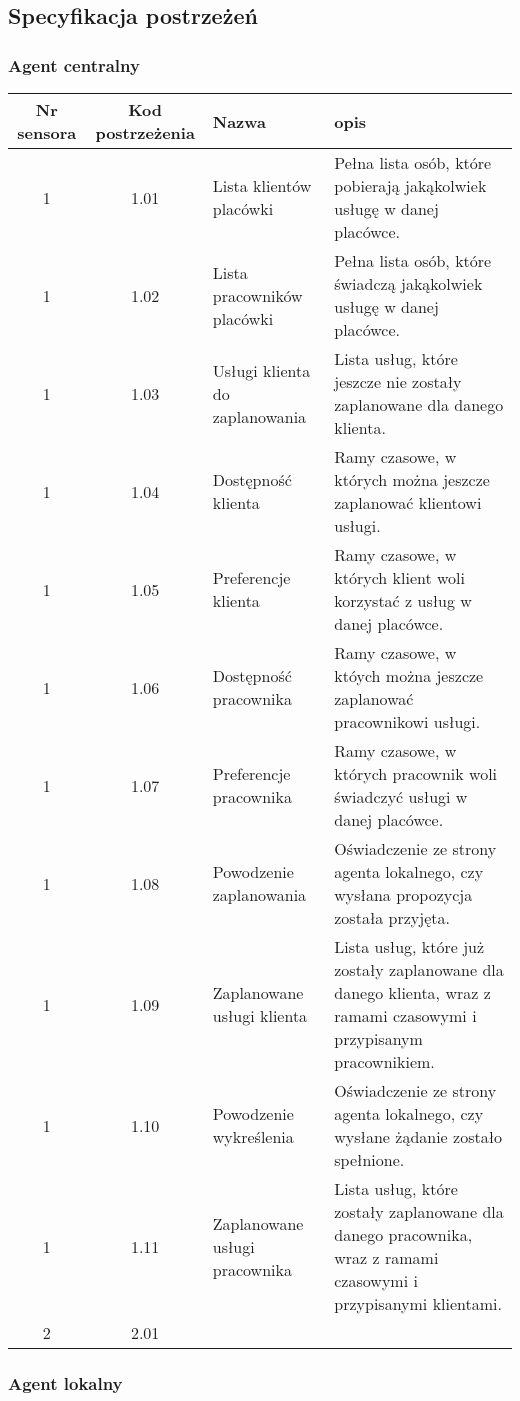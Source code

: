 \subsection{Specyfikacja postrzeżeń}

\subsubsection{Agent centralny}

\begin{tabular}{c|c|p{3cm}|p{5cm}}
Nr sensora & Kod postrzeżenia & Nazwa & opis\\
\hline
1 & 1.01 & Lista klientów placówki & Pełna lista osób, które pobierają jakąkolwiek usługę w danej placówce.\\
1 & 1.02 & Lista pracowników placówki & Pełna lista osób, które świadczą jakąkolwiek usługę w danej placówce.\\
1 & 1.03 & Usługi klienta do zaplanowania & Lista usług, które jeszcze nie zostały zaplanowane dla danego klienta.\\
1 & 1.04 & Dostępność klienta & Ramy czasowe, w których można jeszcze zaplanować klientowi usługi.\\
1 & 1.05 & Preferencje klienta & Ramy czasowe, w których klient woli korzystać z usług w danej placówce.\\
1 & 1.06 & Dostępność pracownika & Ramy czasowe, w któych można jeszcze zaplanować pracownikowi usługi.\\
1 & 1.07 & Preferencje pracownika & Ramy czasowe, w których pracownik woli świadczyć usługi w danej placówce.\\
1 & 1.08 & Powodzenie zaplanowania & Oświadczenie ze strony agenta lokalnego, czy wysłana propozycja została przyjęta. \\
1 & 1.09 & Zaplanowane usługi klienta & Lista usług, które już zostały zaplanowane dla danego klienta, wraz z ramami czasowymi i przypisanym pracownikiem. \\
1 & 1.10 & Powodzenie wykreślenia & Oświadczenie ze strony agenta lokalnego, czy wysłane żądanie zostało spełnione. \\
1 & 1.11 & Zaplanowane usługi pracownika & Lista usług, które zostały zaplanowane dla danego pracownika, wraz z ramami czasowymi i przypisanymi klientami.\\
\hline
2 & 2.01 & 	 &  \\
\end{tabular}


\subsubsection{Agent lokalny}

